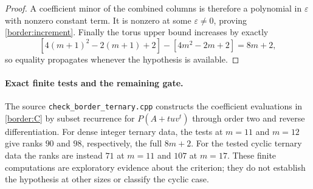 \begin{proof}
A coefficient minor of the combined columns is therefore a
polynomial in $\varepsilon$ with nonzero constant term. It is
nonzero at some $\varepsilon\ne0$, proving
\eqref{border:increment}. Finally the torus upper bound increases
by exactly
\[
 [4(m+1)^2-2(m+1)+2]-[4m^2-2m+2]=8m+2,
\]
so equality propagates whenever the hypothesis is available.
\end{proof}

\paragraph{Exact finite tests and the remaining gate.}
The source \texttt{check\_border\_ternary.cpp} constructs the
coefficient evaluations in \eqref{border:C} by subset recurrence
for $P(A+tuv^t)$ through order two and reverse differentiation.
For dense integer ternary data, the tests at $m=11$ and $m=12$
give ranks $90$ and $98$, respectively, the full $8m+2$.
For the tested cyclic ternary data the ranks are instead $71$
at $m=11$ and $107$ at $m=17$. These finite computations are
exploratory evidence about the criterion; they do not establish
the hypothesis at other sizes or classify the cyclic case.

